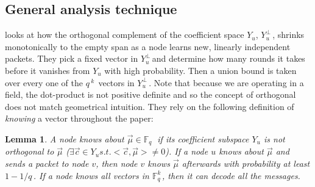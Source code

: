 \documentclass{article} %
\newtheorem{lemma}[theorem]{Lemma}
\def\numMessages{\textit{k}\,}
\def\fieldSize{\textit{q}\,}
\def\dualSpace{$Y_u^{\perp}$\,}
\def\field{\mathbb{F}_{\fieldSize}\,}
\begin{document}
\subsection{General analysis technique}
\cite{haeupler2011analyzing} looks at how the orthogonal complement of the coefficient space $Y_u$, \dualSpace, shrinks monotonically to the empty span as a node learns new, linearly independent packets. They pick a fixed vector in \dualSpace and determine how many rounds it takes before it vanishes from $Y_u$ with high probability. Then a union bound is taken over every one of the $\fieldSize^{\numMessages}$ vectors in \dualSpace. Note that because we are operating in a field, the dot-product is not positive definite and so the concept of orthogonal does not match geometrical intuition. They rely on the following definition of \textit{knowing} a vector throughout the paper:
\begin{lemma}
A node knows about $\vec{\mu} \in \field$ if its coefficient subspace $Y_u$ is not orthogonal to $\vec{\mu}$ ($\exists \vec{c} \in Y_u s.t. <\vec{c},\vec{\mu}>\neq0$). If a node $u$ knows about $\vec{\mu}$ and sends a packet to node $v$, then node $v$ knows $\vec{\mu}$ afterwards with probability at least $1-1/\fieldSize$. If a node knows all vectors in $\mathbb{F}_{\fieldSize}^{\numMessages}$, then it can decode all the messages.
\end{lemma}
\end{document}
